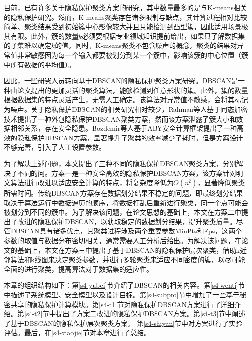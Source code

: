 目前，已有许多关于隐私保护聚类方案的研究，其中数量最多的是与K-means相关的隐私保护研究\cite{hegde2021sok}。然而，K-means聚类存在诸多限制与缺点，其计算过程相对比较简单、聚类结果受到初始簇中心影像较大并且只能检测到凸型簇，因此适用场景极其有限。此外，簇的数量$k$必须要根据专业领域知识提前给出，如果只了解数据集的子集难以确定$k$的值。同时，K-means聚类不包含噪声的概念，聚类的结果对异常值非常敏感因为每一个输入都要被划分到某一个簇中，影响该簇的中心位置（簇中所有数据的平均值）。

因此，一些研究人员转向基于DBSCAN的隐私保护聚类方案研究。DBSCAN是一种由论文\cite{ester1996density}提出的更加灵活的聚类算法，能够检测到任意形状的簇。此外，簇的数量根据数据集的特点灵活产生，无需人工确定。该算法对异常值不敏感，会将其标记为噪声。关于隐私保护DBSCAN的相关研究相对较少，Rahman等人\cite{rahman2017towards}基于同态加密技术提出了一种外包隐私保护DBSCAN聚类方案，然而该方案泄露了簇大小和数据相邻关系，存在安全隐患。Bozdemir等人\cite{bozdemir2021privacy}基于ABY安全计算框架提出了一种高效的隐私保护DBSCAN方案，显著提升了聚类的效率减少了耗时，但是方案设计不够完善，引入了人工设置参数。

为了解决上述问题，本文提出了三种不同的隐私保护DBSCAN聚类方案，分别解决了不同的问。方案一是一种安全高效的隐私保护DBSCAN方案，该方案针对明文算法进行改进以适应安全计算的特点，将复杂度降低为$O(n^2)$，显著降低聚类所需时间。传统DBSCAN方案存在数据划分结果不稳定的问题，即最终划分结果取决于算法运行中数据遍历的顺序，将数据打乱后重新进行聚类，同一个点可能会被划分到不同的簇中。为了解决该问题，在论文\cite{tran2013revised}思想的基础上，本文在方案二中提出了改进的隐私保护DBSCAN，以获取稳定的数据划分结果，提升聚类质量。尽管DBSCAN具有诸多优点，其聚类过程涉及两个重要参数MinPts和Eps，这两个参数的取值与数据分布密切相关，通常需要人工分析后给出。为解决该问题，在论文\cite{latifi2021dbhc}的基础上，本文在方案三中提出了基于DBSCAN的隐私保护层次聚类，借助k近邻算法和k线图来决定聚类参数，并进行多轮聚类来适应不同密度的簇，以尽可能全面的进行聚类，提高算法对于数据集的适应性。

本章的组织结构如下：第\ref{s4-yubei}节介绍了DBSCAN的相关内容。第\ref{s4-wenti}节中描述了系统模型、安全模型以及设计目标。第\ref{s4-subpro}节中增加了一些基于秘密共享的隐私保护计算模块。第\ref{s4-t1}节对隐私保护DBSCAN方案进行了详细介绍。第\ref{s4-t2}节中提出了方案二改进的隐私保护DBSCAN方案。第\ref{s4-t3}节中阐述了基于DBSCAN的隐私保护层次聚类方案。
第\ref{s4-shiyan}节中对方案进行了实验评估。最后，在\ref{s4-xiaojie}节对本章进行了总结。

